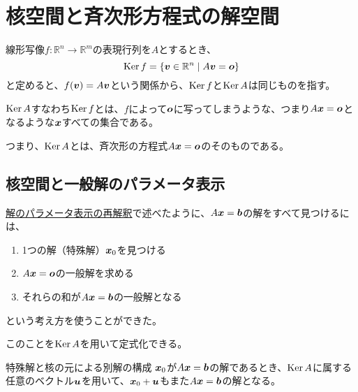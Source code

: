 \documentclass[../../../topic_linear-algebra]{subfiles}
\begin{document}
\sectionline
\section{核空間と斉次形方程式の解空間}

線形写像$f\colon \mathbb{R}^n \to \mathbb{R}^m$の表現行列を$A$とするとき、
\begin{equation*}
  \operatorname{Ker} f = \{ \vb*{v} \in \mathbb{R}^n \mid A\vb*{v} = \vb*{o} \}
\end{equation*}
と定めると、$f(\vb*{v}) = A\vb*{v}$という関係から、$\operatorname{Ker} f$と$\operatorname{Ker} A$は同じものを指す。

\br

$\operatorname{Ker} A$すなわち$\operatorname{Ker} f$とは、$f$によって$\vb*{o}$に写ってしまうような、つまり$A\vb*{x}=\vb*{o}$となるような$\vb*{x}$すべての集合である。

\br

つまり、$\operatorname{Ker} A$とは、斉次形の方程式$A\vb*{x} = \vb*{o}$のそのものである。

\subsection{核空間と一般解のパラメータ表示}

\hyperref[sec:reinterpretation-of-parametric-solution]{解のパラメータ表示の再解釈}で述べたように、$A\vb*{x} = \vb*{b}$の解をすべて見つけるには、
\begin{enumerate}
  \item 1つの解（特殊解）$\vb*{x}_0$を見つける
  \item $A\vb*{x} = \vb*{o}$の一般解を求める
  \item それらの和が$A\vb*{x} = \vb*{b}$の一般解となる
\end{enumerate}
という考え方を使うことができた。

\br

このことを$\operatorname{Ker} A$を用いて定式化できる。

\begin{theorem}{特殊解と核の元による別解の構成}
  $\vb*{x}_0$が$A\vb*{x} = \vb*{b}$の解であるとき、$\operatorname{Ker} A$に属する任意のベクトル$\vb*{u}$を用いて、$\vb*{x}_0 + \vb*{u}$もまた$A\vb*{x} = \vb*{b}$の解となる。
\end{theorem}
\end{document}
